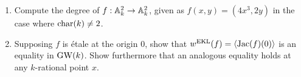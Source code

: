 \documentclass[english]{article}
\begin{document}
\setcounter{section}{2}
\setcounter{subsection}{1}
\setcounter{theorem}{2}
\begin{exercise}\label{exercise-wekl} $\ $
\begin{enumerate}

	\item Compute the degree of $f : \mathbb{A}_k^2 \to \mathbb{A}_k^2$, given as $f(x,y) = (4x^3, 2y)$ in the case where $\text{char}(k)\neq 2$.
	
	\item Supposing $f$ is \'etale at the origin $0$, show that $w^{\text{EKL}}(f) = \left\langle \text{Jac}(f)(0) \right\rangle$ is an equality in $\text{GW}(k)$. Show furthermore that an analogous equality holds at any $k$-rational point $x$. 
	
\end{enumerate}
\end{exercise}
\end{document}
